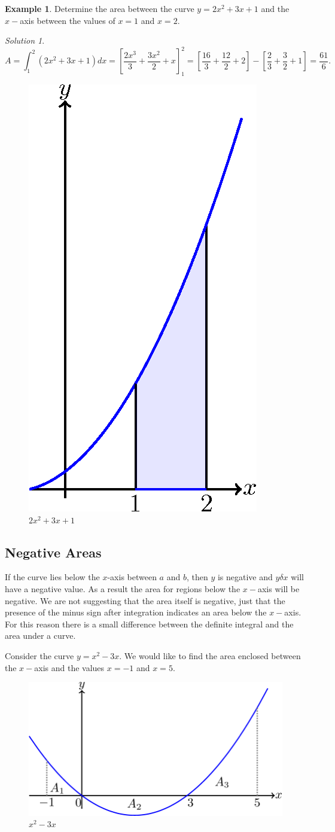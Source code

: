\documentclass[
  11pt,
  oneside]{book}
\newcommand{\slide}{}
\theoremstyle{definition}
\theoremstyle{definition}
\newtheorem{example}{Example}[chapter]
\theoremstyle{definition}
\theoremstyle{definition}
\theoremstyle{remark}
\newtheorem*{solution}{Solution}
\begin{document}
\begin{example}
Determine the area between the curve \(y=2x^2+3x+1\) and the \(x-\)axis between the values of \(x=1\) and \(x=2\).
\end{example}

\begin{solution}
\leavevmode

\[
A=\int_1^2(2x^2+3x+1)dx = \left[\frac{2x^3}{3}+\frac{3x^2}{2}+x\right]_1^2 = \left[\frac{16}{3}+\frac{12}{2}+2\right]-\left[\frac{2}{3}+\frac 32 + 1\right] = \frac{61}{6}.
\]

\begin{figure}

{\centering \includegraphics[width=0.15\linewidth]{tikztopng-figure21} 

}

\caption{$2x^2+3x+1$}\label{fig:unnamed-chunk-43}
\end{figure}

\end{solution}

\slide

\subsection{Negative Areas}\label{negative-areas}

If the curve lies below the \(x\)-axis between \(a\) and \(b\), then \(y\) is negative and \(y\delta x\) will have a negative value. As a result the area for regions below the \(x-\)axis will be negative. We are not suggesting that the area itself is negative, just that the presence of the minus sign after integration indicates an area below the \(x-\)axis. For this reason there is a small difference between the definite integral and the area under a curve.

Consider the curve \(y = x^2 - 3x\). We would like to find the area enclosed between the \(x-\)axis and the values \(x = -1\) and \(x = 5\).

\begin{figure}

{\centering \includegraphics[width=0.4\linewidth]{tikztopng-figure22} 

}

\caption{$x^2-3x$}\label{fig:unnamed-chunk-44}
\end{figure}
\end{document}
